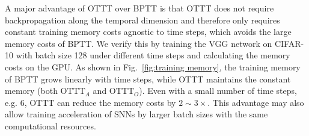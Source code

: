 \documentclass{article}
\begin{document}
A major advantage of OTTT over BPTT is that OTTT does not require backpropagation along the temporal dimension and therefore only requires constant training memory costs agnostic to time steps, which avoids the large memory costs of BPTT. We verify this by training the VGG network on CIFAR-10 with batch size 128 under different time steps and calculating the memory costs on the GPU. As shown in Fig.~\ref{fig:training memory}, the training memory of BPTT grows linearly with time steps, while OTTT maintains the constant memory (both OTTT$_A$ and OTTT$_O$). Even with a small number of time steps, e.g. 6, OTTT can reduce the memory costs by $2\sim 3\times$. This advantage may also allow training acceleration of SNNs by larger batch sizes with the same computational resources.

\vspace{-2mm}
\end{document}

